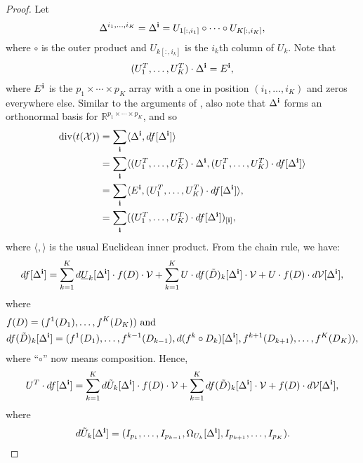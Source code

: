 \begin{proof}
 Let
\begin{align*}
\Delta^{i_1,\ldots,i_K} = \Delta^{\bf i} = U_{1[:,i_1]} \circ \cdots \circ U_{K[:,i_K]},
\end{align*}
where $\circ$ is the outer product and $U_{k[:,i_k]}$ is the $i_k$th column of $U_k$. Note that
\begin{align*}
(U_1^T,\ldots,U_K^T)\cdot\Delta^{\bf i} = E^{\bf i},
\end{align*}
where $E^{\bf i}$ is the $p_1\times\cdots\times p_K$ array with a one in position $(i_1,\ldots,i_K)$ and zeros everywhere else. Similar to the arguments of \cite{candes2013unbiased}, also note that $\Delta^{\bf i}$ forms an orthonormal basis for $\mathbb{R}^{p_1\times\cdots\times p_K}$, and so
\begin{align}
\operatorname*{div}(t(\mathcal{X})) &= \sum_{\bf i} \langle\Delta^{\bf i}, df[\Delta^{\bf i}]\rangle \nonumber\\
&= \sum_{\bf i} \langle(U_1^T,\ldots,U_K^T)\cdot\Delta^{\bf i}, (U_1^T,\ldots,U_K^T)\cdot df[\Delta^{\bf i}]\rangle\nonumber\\
&= \sum_{\bf i} \langle E^{\bf i}, (U_1^T,\ldots,U_K^T)\cdot df[\Delta^{\bf i}]\rangle,\nonumber\\
\label{equation:divergence.index}
&= \sum_{\bf i} ((U_1^T,\ldots,U_K^T)\cdot df[\Delta^{\bf i}])_{[\mathbf{i}]},
\end{align}
where $\langle , \rangle$ is the usual Euclidean inner product. From the chain rule, we have:
\begin{align*}
df[\Delta^{\bf i}] = \sum_{k=1}^Kd\underline{U}_k[\Delta^{\bf i}] \cdot f(D) \cdot \mathcal{V} + \sum_{k=1}^K U \cdot df(\tilde{D})_k[\Delta^{\bf i}] \cdot \mathcal{V} + U \cdot f(D) \cdot d\mathcal{V}[\Delta^{\bf i}],
\end{align*}
where
\begin{align*}
&f(D) = (f^1(D_1),\ldots,f^K(D_K)) \text{ and}\\
&df(\tilde{D})_k[\Delta^{\bf i}] = (f^1(D_1),\ldots,f^{k-1}(D_{k-1}),d(f^k \circ D_k)[\Delta^{\bf i}],f^{k+1}(D_{k+1}),\ldots,f^K(D_K)),
\end{align*}
where ``$\circ$'' now means composition. Hence,
\begin{align}
\label{equation:u.times.df}
U^T \cdot df[\Delta^{\bf i}] = \sum_{k=1}^Kd\tilde{U}_k[\Delta^{\bf i}] \cdot f(D) \cdot \mathcal{V} + \sum_{k=1}^K df(\tilde{D})_k[\Delta^{\bf i}] \cdot \mathcal{V} + f(D) \cdot d\mathcal{V}[\Delta^{\bf i}],
\end{align}
where
\begin{align}
d\tilde{U}_k[\Delta^{\bf i}] = (I_{p_1},\ldots,I_{p_{k-1}},\Omega_{U_k}[\Delta^{\bf i}],I_{p_{k+1}},\ldots,I_{p_K}). \label{equation:U.tilde}
\end{align}


\end{proof}
